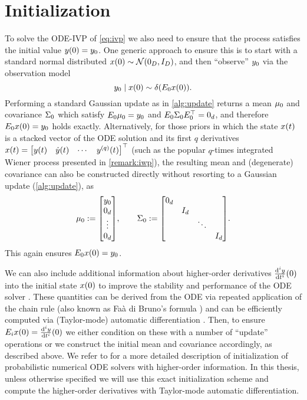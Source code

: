 \documentclass{mimosis}
\begin{document}
\section{Initialization}
\label{sec:org607b435}
To solve the ODE-IVP of
\cref{eq:ivp} we also need to ensure that the process satisfies the initial value
\(y(0) = y_0\).
One generic approach to ensure this is to start with a standard normal distributed \(x(0) \sim \N( 0_D, \I{D} )\), and then ``observe'' \(y_0\) via the observation model
\begin{equation}
  \val_0 \mid \st(0) \sim \dirac(\proj{0} \st(0) ).
\end{equation}
Performing a standard Gaussian update as in \cref{alg:update} returns a mean \(\mu_{0}\) and covariance \(\Sigma_{0}\) which satisfy
\(E_{0}\mu_{0}=y_0\) and
\(E_{0}\Sigma_{0}E_{0}^\top=0_d\),
and therefore \(E_{0}x(0)=y_0\) holds exactly.
Alternatively, for those priors in which the state \(x(t)\) is a stacked vector of the ODE solution and its first \(q\) derivatives
\(x(t) = \begin{bmatrix} y(t) & \dot{y}(t) & \cdots & y^{(q)}(t) \end{bmatrix}^\top\)
(such as the popular \(q\)-times integrated Wiener process presented in \cref{remark:iwp}),
the resulting mean and (degenerate) covariance can also be constructed directly without resorting to a Gaussian update (\cref{alg:update}), as
\begin{equation}
  \mean{0} := \mqty[ \val_0 \\ 0_d \\ \vdots \\ 0_d ],
\qquad
  \cov{0} := \mqty[\dmat{0_d, I_d, \ddots, I_d}].
\end{equation}
This again ensures \(E_{0}x(0)=y_0\).

We can also include additional information about higher-order derivatives
\(\dv[i]{y}{t}{}(0)\)
into the initial state \(x(0)\) to improve the stability and performance of the ODE solver \parencite{kraemer20_stabl_implem_probab_ode_solver}.
These quantities
can be derived from the ODE via repeated application of the chain rule (also known as Faà di Bruno's formula \parencite{roman1980formula})
and can be efficiently computed via (Taylor-mode) automatic differentiation
\parencite{griewank2000evaluating,bettencourt2019taylormode}.
Then, to ensure
\(E_{i}x(0) = \dv[i]{y}{t}{}(0)\)
we either condition on these with a number of ``update'' operations or we construct the initial mean and covariance accordingly, as described above.
We refer to \textcite{kraemer20_stabl_implem_probab_ode_solver} for a more detailed description of initialization of probabilistic numerical ODE solvers with higher-order information.
In this thesis, unless otherwise specified we will use this exact initialization scheme and compute the higher-order derivatives with Taylor-mode automatic differentiation.
\end{document}
